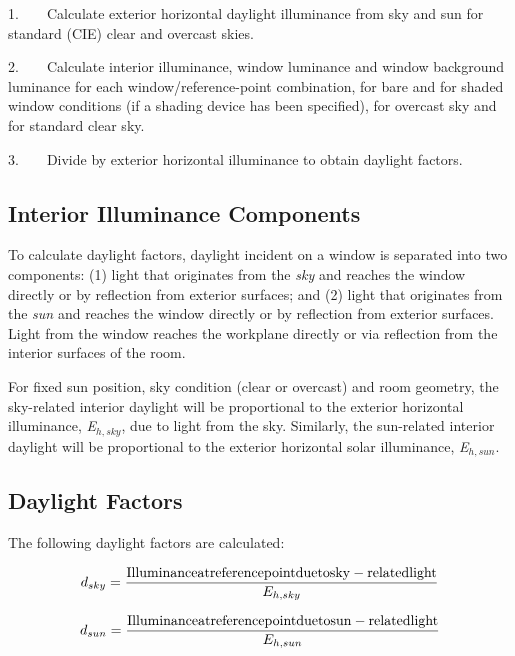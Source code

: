 1.~~~~Calculate exterior horizontal daylight illuminance from sky and sun for standard (CIE) clear and overcast skies.

2.~~~~Calculate interior illuminance, window luminance and window background luminance for each window/reference-point combination, for bare and for shaded window conditions (if a shading device has been specified), for overcast sky and for standard clear sky.

3.~~~~Divide by exterior horizontal illuminance to obtain daylight factors.

\subsection{Interior Illuminance Components}\label{interior-illuminance-components}

To calculate daylight factors, daylight incident on a window is separated into two components: (1) light that originates from the \emph{sky} and reaches the window directly or by reflection from exterior surfaces; and (2) light that originates from the \emph{sun} and reaches the window directly or by reflection from exterior surfaces. Light from the window reaches the workplane directly or via reflection from the interior surfaces of the room.

For fixed sun position, sky condition (clear or overcast) and room geometry, the sky-related interior daylight will be proportional to the exterior horizontal illuminance, \emph{E\(_{h,sky}\)}, due to light from the sky. Similarly, the sun-related interior daylight will be proportional to the exterior horizontal solar illuminance, \emph{E\(_{h,sun}\)}.

\subsection{Daylight Factors}\label{daylight-factors}

The following daylight factors are calculated:

\begin{equation}
{d_{sky}} = \frac{{{\rm{Illuminance at reference point due to sky - related light}}}}{{{E_{h,sky}}}}
\end{equation}

\begin{equation}
{d_{sun}} = \frac{{{\rm{Illuminance at reference point due to sun - related light}}}}{{{E_{h,sun}}}}
\end{equation}

